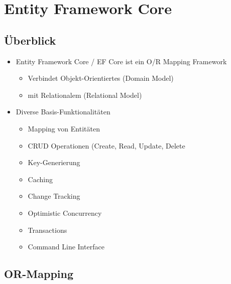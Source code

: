 
\section{Entity Framework Core}


\subsection{Überblick}
\begin{itemize}
    \item Entity Framework Core / EF Core ist ein O/R Mapping Framework
    \begin{itemize}
        \item Verbindet Objekt-Orientiertes (Domain Model)
        \item mit Relationalem (Relational Model)
    \end{itemize}
    \item Diverse Basis-Funktionalitäten
    \begin{itemize}
        \item Mapping von Entitäten
        \item CRUD Operationen (Create, Read, Update, Delete
        \item Key-Generierung
        \item Caching
        \item Change Tracking
        \item Optimistic Concurrency
        \item Transactions
        \item Command Line Interface
    \end{itemize}
\end{itemize}


\subsection{OR-Mapping}

